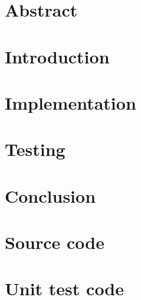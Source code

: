 \documentclass[12pt]{report}
\author{Chiemerie Ezechukwu}
\begin{document}
  

  \chapter*{Abstract}
  


  \renewcommand{\contentsname}{Table of Contents}
  \setlength{\parskip}{0pt}
  \tableofcontents
  \listoffigures
  \printacronyms

  \setlength{\parskip}{\baselineskip}

  \chapter{Introduction}
  

  \chapter{Implementation}
  

  \chapter{Testing}
  

  \chapter{Conclusion}
  

  \appendix
  \chapter{Source code}\label{appendix:sourcecode}
  

  \chapter{Unit test code}\label{appendix:unittest}
  

  
  \renewcommand{\bibname}{References}
  
\end{document}
